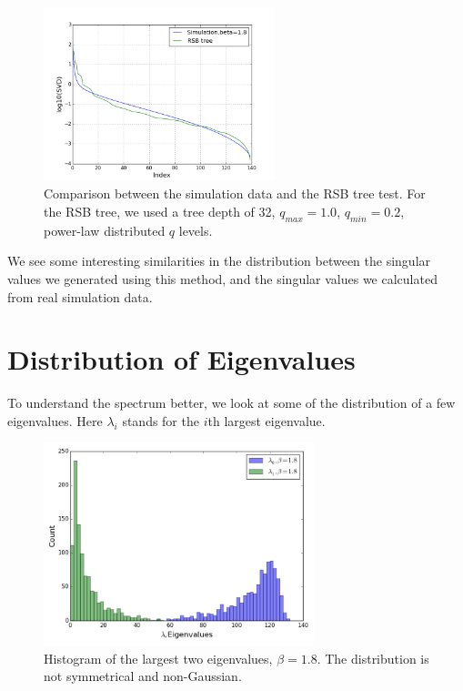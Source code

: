 \begin{enumerate}
\begin{figure}[ht]
  \centering
  \includegraphics[width=0.6\textwidth]{img/matrix/svd_compare_rsb.png}
  \caption{Comparison between the simulation data and the RSB tree test. For the RSB tree,
we used a tree depth of 32, $q_{max}=1.0$, $q_{min}=0.2$, power-law distributed $q$ levels.}
  \label{fig:compare}
\end{figure}


We see some interesting similarities in the distribution between the
singular values we generated using this method, and the singular values we 
calculated from real simulation data.

\end{enumerate}

\section{Distribution of Eigenvalues}

To understand the spectrum better, we look at some of the distribution of 
a few eigenvalues. Here $\lambda_i$ stands for the $i$th largest eigenvalue.
 
\begin{figure}[ht]
\centering
  \includegraphics[width=0.7\textwidth]{img/matrix/eigHist1.png} 
\caption{Histogram of the largest two eigenvalues, $\beta=1.8$. The distribution 
is not symmetrical and non-Gaussian.}
\label{fig:hist1}
\end{figure}

